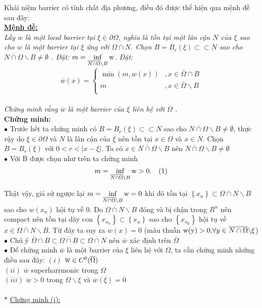 Khái niệm barrier có tính chất địa phương, điều đó được thể hiện qua mệnh đề sau đây:
\\
{\bf \underline {Mệnh đề:}}
\\
{\it
Lấy $w$ là một local barrier tại $\xi \in \partial \Omega$, nghĩa là tồn tại một  lân cận $N$ của $\xi$ sao cho $w$ là một barrier tại $\xi$ ứng với $\Omega  \cap N$. Chọn $B=B_r(\xi) \subset  \subset N$ sao cho $\overline {N \cap \Omega } \backslash B \ne \emptyset $ . Đặt:
$m = \mathop {{\rm{inf}}}\limits_{\overline {N \cap \Omega } \backslash B} {\rm{w}}$. Đặt:
  \[\overline w \left( x \right) = \left\{ {\begin{array}{*{20}{c}}
   {\min \left( {m,w\left( x \right)} \right)} & {,x \in \overline \Omega   \cap B}  \\
   m & {,x \in \overline \Omega  \backslash B}  \\
\end{array}} \right.\] \\
Chứng minh rằng $\overline w$ là một barrier của $\xi$ liên hệ với $\Omega$ .}\\
{\bf Chứng minh:}
\\
$ \bullet$ Trước hết ta chứng minh có $B=B_r(\xi) \subset  \subset N$ sao cho $\overline {N \cap \Omega } \backslash B \ne \emptyset $, thực vậy do $\xi \in \partial \Omega$ và $N$ là lân cận của $\xi$ nên tồn tại $x\in \Omega$ và $x\in N$. Chọn $B=B_r(\xi)$ với $0<r<|x-\xi|$. Ta có $x\in \overline {N \cap \Omega } \backslash B$ nên $\overline {N \cap \Omega } \backslash B \ne \emptyset$
\\
$ \bullet$ Với B được chọn như trên ta chứng minh $$m = \mathop {{\rm{inf}}}\limits_{\overline {N \cap \Omega } \backslash B} {\rm{w}}>0.\quad (1)$$

Thật vậy, giả sử ngược lại  $m = \mathop {{\rm{inf}}}\limits_{\overline {N \cap \Omega } \backslash B} {\rm{w}}=0$ khi đó tồn tại 
$\left\{ {x_n } \right\} \subset \overline {\Omega  \cap N} \backslash B$ sao cho $w(x_n)$ hội tụ về 0. Do $
\overline {\Omega  \cap N} \backslash B$ đóng và bị chận trong $R^n$ nên compact nên tồn tại dãy con $\left\{ {x_{n_k } } \right\} \subset \left\{ {x_n } \right\}$ sao cho $\left\{ {x_{n_k } } \right\}$ hội tụ về $x \in \overline {\Omega  \cap N} \backslash B$. Từ đây ta suy ra $w(x)=0$ (mâu thuẫn ${\rm{w(y) > 0,}}\forall y \in \overline {N \cap \Omega } \backslash \xi $)
\\
$ \bullet$ Chú ý $\overline \Omega   \cap B \subset \overline {\Omega  \cap B}  \subset \overline {\Omega  \cap N}$ nên ${\overline{w}}
$ xác định trên $\overline \Omega$
\\
$\bullet$ Để chứng minh $\overline w$ là một barrier của $\xi$ liên hệ với $\Omega$, ta cần chứng minh những điều sau đây:
$(i)$ $\overline {\rm{w}}  \in C^0 (\overline \Omega  )$\\
$(ii)$ $\overline w$ superharrmonic trong $\Omega$\\
$(iii)$ $\overline w>0$ trong $\Omega \backslash \xi $ và $\overline w(\xi)=0$\\\\
$*$  \underline {Chứng minh (i):}

